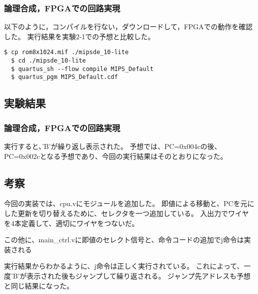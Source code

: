 \subsubsection{論理合成，FPGAでの回路実現}
以下のように，コンパイルを行ない，ダウンロードして，FPGAでの動作を確認した。
実行結果を実験2-1での予想と比較した。

\begin{lstlisting}[caption={コンパイル，ダウンロード},label={コンパイル，ダウンロード2-2}]
  $ cp rom8x1024.mif ./mipsde_10-lite
  $ cd ./mipsde_10-lite
  $ quartus_sh --flow compile MIPS_Default
  $ quartus_pgm MIPS_Default.cdf 
\end{lstlisting}

\subsection{実験結果}
\subsubsection{論理合成，FPGAでの回路実現}
実行すると、'B'が繰り返し表示された。
予想では、PC=0x004cの後、PC=0x002cとなる予想であり、今回の実行結果はそのとおりになった。

\subsection{考察}
今回の実装では、cpu.vにモジュールを追加した。
即値による移動と、PCを元にした更新を切り替えるために、セレクタを一つ追加している。
入出力でワイヤを4本定義して、適切にワイヤをつないだ。

この他に、main\_ctrl.vに即値のセレクト信号と、命令コードの追加でj命令は実装される

実行結果からわかるように、j命令は正しく実行されている。
これによって、一度'B'が表示された後もジャンプして繰り返される。
ジャンプ先アドレスも予想と同じ結果になった。
